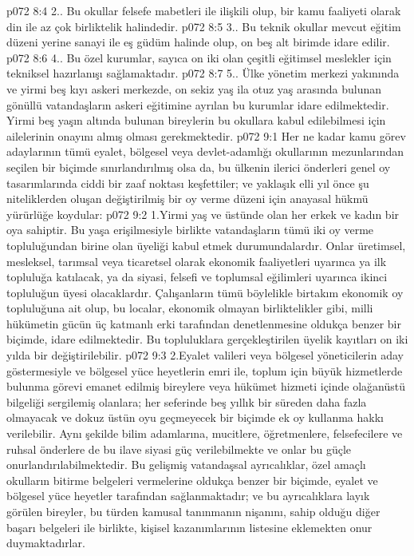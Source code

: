 \vs p072 8:4 2.\bibnobreakspace {}. Bu okullar felsefe mabetleri ile ilişkili olup, bir kamu faaliyeti olarak din ile az çok birliktelik halindedir.
\vs p072 8:5 3.\bibnobreakspace {}. Bu teknik okullar mevcut eğitim düzeni yerine sanayi ile eş güdüm halinde olup, on beş alt birimde idare edilir.
\vs p072 8:6 4.\bibnobreakspace {}. Bu özel kurumlar, sayıca on iki olan çeşitli eğitimsel meslekler için tekniksel hazırlanışı sağlamaktadır.
\vs p072 8:7 5.. Ülke yönetim merkezi yakınında ve yirmi beş kıyı askeri merkezde, on sekiz yaş ila otuz yaş arasında bulunan gönüllü vatandaşların askeri eğitimine ayrılan bu kurumlar idare edilmektedir. Yirmi beş yaşın altında bulunan bireylerin bu okullara kabul edilebilmesi için ailelerinin onayını almış olması gerekmektedir.
\vs p072 9:1 Her ne kadar kamu görev adaylarının tümü eyalet, bölgesel veya devlet\hyp{}adamlığı okullarının mezunlarından seçilen bir biçimde sınırlandırılmış olsa da, bu ülkenin ilerici önderleri genel oy tasarımlarında ciddi bir zaaf noktası keşfettiler; ve yaklaşık elli yıl önce şu niteliklerden oluşan değiştirilmiş bir oy verme düzeni için anayasal hükmü yürürlüğe koydular:
\vs p072 9:2 1.\bibnobreakspace Yirmi yaş ve üstünde olan her erkek ve kadın bir oya sahiptir. Bu yaşa erişilmesiyle birlikte vatandaşların tümü iki oy verme topluluğundan birine olan üyeliği kabul etmek durumundalardır. Onlar üretimsel, mesleksel, tarımsal veya ticaretsel olarak ekonomik faaliyetleri uyarınca ya ilk topluluğa katılacak, ya da siyasi, felsefi ve toplumsal eğilimleri uyarınca ikinci topluluğun üyesi olacaklardır. Çalışanların tümü böylelikle birtakım ekonomik oy topluluğuna ait olup, bu localar, ekonomik olmayan birliktelikler gibi, milli hükümetin gücün üç katmanlı erki tarafından denetlenmesine oldukça benzer bir biçimde, idare edilmektedir. Bu topluluklara gerçekleştirilen üyelik kayıtları on iki yılda bir değiştirilebilir.
\vs p072 9:3 2.\bibnobreakspace Eyalet valileri veya bölgesel yöneticilerin aday göstermesiyle ve bölgesel yüce heyetlerin emri ile, toplum için büyük hizmetlerde bulunma görevi emanet edilmiş bireylere veya hükümet hizmeti içinde olağanüstü bilgeliği sergilemiş olanlara; her seferinde beş yıllık bir süreden daha fazla olmayacak ve dokuz üstün oyu geçmeyecek bir biçimde ek oy kullanma hakkı verilebilir. Aynı şekilde bilim adamlarına, mucitlere, öğretmenlere, felsefecilere ve ruhsal önderlere de bu ilave siyasi güç verilebilmekte ve onlar bu güçle onurlandırılabilmektedir. Bu gelişmiş vatandaşsal ayrıcalıklar, özel amaçlı okulların bitirme belgeleri vermelerine oldukça benzer bir biçimde, eyalet ve bölgesel yüce heyetler tarafından sağlanmaktadır; ve bu ayrıcalıklara layık görülen bireyler, bu türden kamusal tanınmanın nişanını, sahip olduğu diğer başarı belgeleri ile birlikte, kişisel kazanımlarının listesine eklemekten onur duymaktadırlar.
